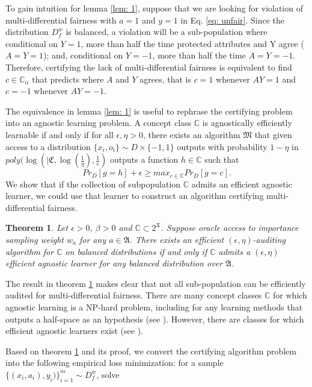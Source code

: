 \documentclass{article}
\newtheorem{thm}{Theorem}[section]
\begin{document}
To gain intuition for lemma \ref{lem: 1}, suppose that we are looking for violation of multi-differential fairness with $a=1$ and $y=1$ in Eq. \eqref{eq: unfair}. Since the distribution $D_{f}^{w}$ is balanced, a violation will be a sub-population where conditional on $Y=1$,  more than half the time protected attributes and Y agree ($A=Y=1$); and, conditional on $Y=-1$, more than half the time $A=Y=-1$. Therefore, certifying the lack of multi-differential fairness is equivalent to find $c\in \mathbb{C}_{\alpha}$ that predicts where $A$ and $Y$ agrees, that is $c=1$ whenever $AY=1$ and $c=-1$ whenever $AY=-1$. 

\bigskip
The equivalence in lemma \ref{lem: 1} is useful to rephrase the certifying problem into an agnostic learning problem. A concept class $\mathbb{C}$ is agnostically efficiently learnable if and only if for all $\epsilon, \eta >0$, there exists an algorithm $\mathfrak{M}$ that given access to a distribution $\{x_{i}, o_{i}\}\sim D\times \{-1, 1\}$ outputs with probability $1-\eta$ in $poly(\log(|\mathfrak{C}, \log(\frac{1}{\eta}), \frac{1}{\epsilon})$ outputs  a function $h\in \mathbb{C}$ such that
$$ Pr_{D}[g=h]  + \epsilon \geq max_{c\in \mathbb{C}}Pr_{D}[g=c]. $$
We show that if the collection of subpopulation $\mathbb{C}$ admits an efficient agnostic learner, we could use that learner to construct an algorithm certifying multi-differential fairness.

\begin{thm}
\label{thm: al}
Let $\epsilon > 0$, $\beta >0$ and $\mathbb{C}\subset 2^{\mathfrak{X}}$. Suppose oracle access to importance sampling weight $w_{a}$ for any $a\in \mathfrak{A}$. There exists an efficient $(\epsilon, \eta)$-auditing algorithm for $\mathbb{C}$ on balanced distributions if and only if $\mathbb{C}$ admits a $( \epsilon,\eta)$ efficient agnostic learner for any balanced distribution over $\mathfrak{A}$.  
\end{thm}

The result in theorem \ref{thm: al} makes clear that not all sub-population can be efficiently audited for multi-differential fairness. There are many concept classes $\mathbb{C}$ for which agnostic learning is a NP-hard problem, including for any learning methods that outputs a half-space as an hypothesis (see \cite{feldman2012agnostic}). However, there are classes for which efficient agnostic learners exist (see \cite{kearns1994toward}).

\bigskip
Based on theorem \ref{thm: al} and its proof,  we convert the certifying algorithm problem into the following empirical loss minimization: for a sample $\{(x_{i}, a_{i}), y_{i})\}_{i=1}^{m}\sim D^{w}_{f}$, solve
\end{document}
